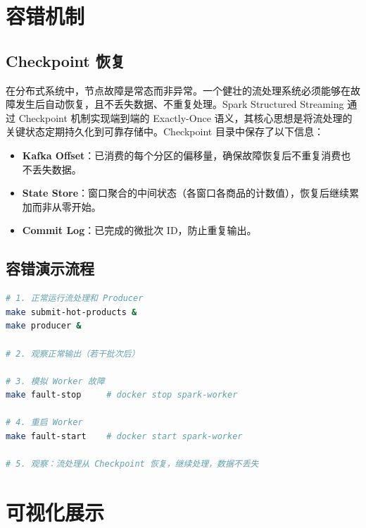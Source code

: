 \documentclass[12pt,a4paper]{article}
\begin{document}
\section{容错机制}

\subsection{Checkpoint 恢复}

在分布式系统中，节点故障是常态而非异常。一个健壮的流处理系统必须能够在故障发生后自动恢复，且不丢失数据、不重复处理。Spark Structured Streaming 通过 Checkpoint 机制实现端到端的 Exactly-Once 语义，其核心思想是将流处理的关键状态定期持久化到可靠存储中。Checkpoint 目录中保存了以下信息：

\begin{itemize}    \item \textbf{Kafka Offset}：已消费的每个分区的偏移量，确保故障恢复后不重复消费也不丢失数据。
    \item \textbf{State Store}：窗口聚合的中间状态（各窗口各商品的计数值），恢复后继续累加而非从零开始。
    \item \textbf{Commit Log}：已完成的微批次 ID，防止重复输出。
\end{itemize}

\subsection{容错演示流程}

\begin{lstlisting}[language=bash, caption={容错演示步骤}]
# 1. 正常运行流处理和 Producer
make submit-hot-products &
make producer &

# 2. 观察正常输出（若干批次后）

# 3. 模拟 Worker 故障
make fault-stop     # docker stop spark-worker

# 4. 重启 Worker
make fault-start    # docker start spark-worker

# 5. 观察：流处理从 Checkpoint 恢复，继续处理，数据不丢失
\end{lstlisting}

\section{可视化展示}
\end{document}

